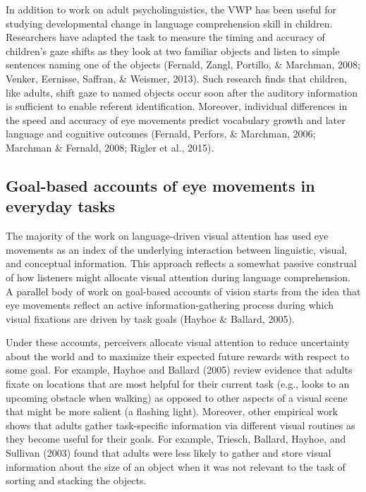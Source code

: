 \documentclass[english,floatsintext,man]{apa6}
\begin{document}
In addition to work on adult psycholinguistics, the VWP has been useful
for studying developmental change in language comprehension skill in
children. Researchers have adapted the task to measure the timing and
accuracy of children's gaze shifts as they look at two familiar objects
and listen to simple sentences naming one of the objects (Fernald,
Zangl, Portillo, \& Marchman, 2008; Venker, Eernisse, Saffran, \&
Weismer, 2013). Such research finds that children, like adults, shift
gaze to named objects occur soon after the auditory information is
sufficient to enable referent identification. Moreover, individual
differences in the speed and accuracy of eye movements predict
vocabulary growth and later language and cognitive outcomes (Fernald,
Perfors, \& Marchman, 2006; Marchman \& Fernald, 2008; Rigler et al.,
2015).

\hypertarget{goal-based-accounts-of-eye-movements-in-everyday-tasks}{%
\subsection{Goal-based accounts of eye movements in everyday
tasks}\label{goal-based-accounts-of-eye-movements-in-everyday-tasks}}

The majority of the work on language-driven visual attention has used
eye movements as an index of the underlying interaction between
linguistic, visual, and conceptual information. This approach reflects a
somewhat passive construal of how listeners might allocate visual
attention during language comprehension. A parallel body of work on
goal-based accounts of vision starts from the idea that eye movements
reflect an active information-gathering process during which visual
fixations are driven by task goals (Hayhoe \& Ballard, 2005).

Under these accounts, perceivers allocate visual attention to reduce
uncertainty about the world and to maximize their expected future
rewards with respect to some goal. For example, Hayhoe and Ballard
(2005) review evidence that adults fixate on locations that are most
helpful for their current task (e.g., looks to an upcoming obstacle when
walking) as opposed to other aspects of a visual scene that might be
more salient (a flashing light). Moreover, other empirical work shows
that adults gather task-specific information via different visual
routines as they become useful for their goals. For example, Triesch,
Ballard, Hayhoe, and Sullivan (2003) found that adults were less likely
to gather and store visual information about the size of an object when
it was not relevant to the task of sorting and stacking the objects.
\end{document}
